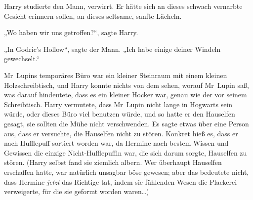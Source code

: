 Harry studierte den Mann, verwirrt. Er hätte sich an dieses schwach vernarbte Gesicht erinnern sollen, an dieses seltsame, sanfte Lächeln.

„Wo haben wir uns getroffen?“, sagte Harry.

„In Godric’s Hollow“, sagte der Mann. „Ich habe einige deiner Windeln gewechselt.“

\later

Mr~Lupins temporäres Büro war ein kleiner Steinraum mit einem kleinen Holzschreibtisch, und Harry konnte nichts von dem sehen, worauf Mr~Lupin saß, was darauf hindeutete, dass es ein kleiner Hocker war, genau wie der vor seinem Schreibtisch. Harry vermutete, dass Mr~Lupin nicht lange in Hogwarts sein würde, oder dieses Büro viel benutzen würde, und so hatte er den Hauselfen gesagt, sie sollten die Mühe nicht verschwenden. Es sagte etwas über eine Person aus, dass er versuchte, die Hauselfen nicht zu stören. Konkret hieß es, dass er nach Hufflepuff sortiert worden war, da Hermine nach bestem Wissen und Gewissen die einzige Nicht-Hufflepuffin war, die sich darum sorgte, Hauselfen zu stören. (Harry selbst fand sie ziemlich albern. Wer überhaupt Hauselfen erschaffen hatte, war natürlich unsagbar böse gewesen; aber das bedeutete nicht, dass Hermine \emph{jetzt} das Richtige tat, indem sie fühlenden Wesen die Plackerei verweigerte, für die sie geformt worden waren…)


